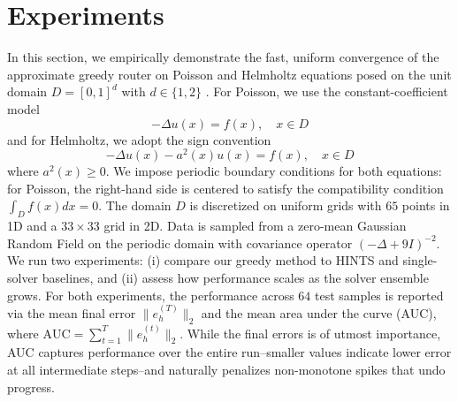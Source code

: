 \documentclass{article} %
\newcommand\ambuj[1]{\textcolor{red}{AT: #1}}
\begin{document}
\section{Experiments}\label{sec:experiments}

In this section, we empirically demonstrate the fast, uniform convergence of the approximate greedy router on Poisson and Helmholtz equations posed on the unit domain $D = [0, 1]^d$ with $d\in \{1, 2\}$ .
For Poisson, we use the constant-coefficient model
$$- \Delta u(x) = f(x), \quad x\in D$$ and for Helmholtz, we adopt the sign convention 
$$-\Delta u(x) - a^2(x)u(x) = f(x), \quad x\in D$$ where $a^2(x) \geq 0$. We impose periodic boundary conditions for both equations: for Poisson, the right-hand side is centered to satisfy the compatibility condition $\int_D f(x)dx = 0$. The domain $D$ is discretized on uniform grids with $65$ points in 1D and a $33 \times 33$ grid in 2D. 
Data is sampled from a zero-mean Gaussian Random Field on the periodic domain with covariance operator $(- \Delta + 9I)^{-2}$. We run two experiments: (i) compare our greedy method to HINTS and single-solver baselines, and (ii) assess how performance scales as the solver ensemble grows. For both experiments, the performance across $64$ test samples is reported via the mean final error $\|e^{(T)}_h\|_2$ and the mean area under the curve (AUC), where $\text{AUC} = \sum_{t = 1}^T\|e^{(t)}_h\|_2$. While the final errors is of utmost importance, AUC captures performance over the entire run--smaller values indicate lower error at all intermediate steps--and naturally penalizes non-monotone spikes that undo progress.
\end{document}
